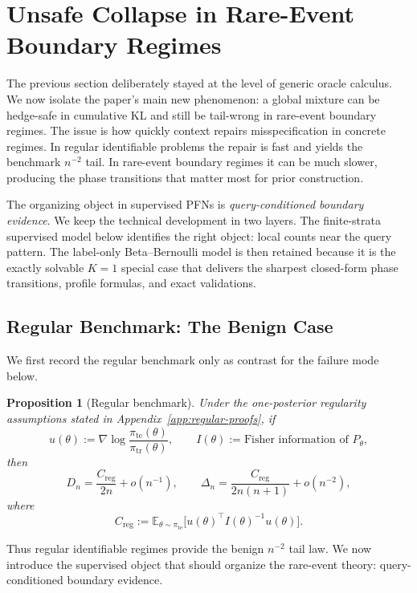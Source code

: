 \documentclass{article}
\newtheorem{proposition}[theorem]{Proposition}
\theoremstyle{definition}
\theoremstyle{remark}
\newcommand{\E}{\mathbb{E}}
\newcommand{\tr}{\mathrm{tr}}
\newcommand{\te}{\mathrm{te}}
\begin{document}
\section{Unsafe Collapse in Rare-Event Boundary Regimes}
\label{sec:rare-events}

The previous section deliberately stayed at the level of generic oracle calculus. We now isolate the paper's main new phenomenon: a global mixture can be hedge-safe in cumulative KL and still be tail-wrong in rare-event boundary regimes. The issue is how quickly context repairs misspecification in concrete regimes. In regular identifiable problems the repair is fast and yields the benchmark $n^{-2}$ tail. In rare-event boundary regimes it can be much slower, producing the phase transitions that matter most for prior construction.

The organizing object in supervised PFNs is \emph{query-conditioned boundary evidence}. We keep the technical development in two layers. The finite-strata supervised model below identifies the right object: local counts near the query pattern. The label-only Beta--Bernoulli model is then retained because it is the exactly solvable $K=1$ special case that delivers the sharpest closed-form phase transitions, profile formulas, and exact validations.

\subsection{Regular Benchmark: The Benign Case}
\label{sec:regular}

We first record the regular benchmark only as contrast for the failure mode below.

\begin{proposition}[Regular benchmark]
\label{prop:regular}
Under the one-posterior regularity assumptions stated in Appendix~\ref{app:regular-proofs}, if
\[
u(\theta):=\nabla \log \frac{\pi_{\te}(\theta)}{\pi_{\tr}(\theta)},
\qquad
I(\theta):=\text{Fisher information of }P_\theta,
\]
then
\[
D_n
=
\frac{C_{\mathrm{reg}}}{2n}
+ o(n^{-1}),
\qquad
\Delta_n
=
\frac{C_{\mathrm{reg}}}{2n(n+1)}
+ o(n^{-2}),
\]
where
\[
C_{\mathrm{reg}}
:=
\E_{\theta\sim\pi_{\te}}
\bigl[
u(\theta)^\top I(\theta)^{-1}u(\theta)
\bigr].
\]
\end{proposition}

Thus regular identifiable regimes provide the benign $n^{-2}$ tail law. We now introduce the supervised object that should organize the rare-event theory: query-conditioned boundary evidence.
\end{document}
